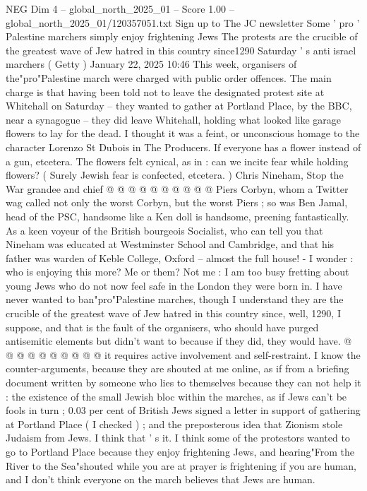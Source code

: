 \begin{textsample}{NEG Dim 4 – global\_north\_2025\_01 – Score 1.00 – global\_north\_2025\_01/120357051.txt}  \label{ex:f4_neg_417}
Sign up to The JC newsletter Some ' pro ' Palestine marchers simply enjoy frightening Jews The protests are the crucible of the greatest wave of Jew hatred in this country since1290 Saturday ' s anti israel marchers ( Getty ) January 22, 2025 10:46 This week, organisers of the"pro"Palestine march were charged with public order offences.
The main charge is that having been told not to leave the designated protest site at Whitehall on Saturday -- they wanted to gather at Portland Place, by the BBC, near a synagogue -- they did leave Whitehall, holding what looked like garage flowers to lay for the dead.
I thought it was a feint, or unconscious homage to the character Lorenzo St Dubois in The Producers.
If everyone has a flower instead of a gun, etcetera.
The flowers felt cynical, as in : can we incite fear while holding flowers? ( Surely Jewish fear is confected, etcetera. ) Chris Nineham, Stop the War grandee and chief @ @ @ @ @ @ @ @ @ @ Piers Corbyn, whom a Twitter wag called not only the worst Corbyn, but the worst Piers ; so was Ben Jamal, head of the PSC, handsome like a Ken doll is handsome, preening fantastically.
As a keen voyeur of the British bourgeois Socialist, who can tell you that Nineham was educated at Westminster School and Cambridge, and that his father was warden of Keble College, Oxford -- almost the full house! - I wonder : who is enjoying this more?
Me or them?
Not me : I am too busy fretting about young Jews who do not now feel safe in the London they were born in.
I have never wanted to ban"pro"Palestine marches, though I understand they are the crucible of the greatest wave of Jew hatred in this country since, well, 1290, I suppose, and that is the fault of the organisers, who should have purged antisemitic elements but didn't want to because if they did, they would have. @ @ @ @ @ @ @ @ @ @ it requires active involvement and self-restraint.
I know the counter-arguments, because they are shouted at me online, as if from a briefing document written by someone who lies to themselves because they can not help it : the existence of the small Jewish bloc within the marches, as if Jews can't be fools in turn ; 0.03 per cent of British Jews signed a letter in support of gathering at Portland Place ( I checked ) ; and the preposterous idea that Zionism stole Judaism from Jews.
I think that ' s it.
I think some of the protestors wanted to go to Portland Place because they enjoy frightening Jews, and hearing"From the River to the Sea"shouted while you are at prayer is frightening if you are human, and I don't think everyone on the march believes that Jews are human.

\end{textsample}
